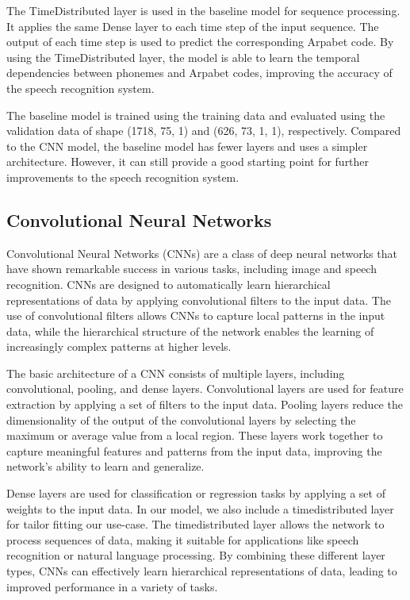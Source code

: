 \documentclass[12pt]{article}
\begin{document}
The TimeDistributed layer is used in the baseline model for sequence processing. It applies the same Dense layer to each time step of the input sequence. The output of each time step is used to predict the corresponding Arpabet code. By using the TimeDistributed layer, the model is able to learn the temporal dependencies between phonemes and Arpabet codes, improving the accuracy of the speech recognition system.

The baseline model is trained using the training data and evaluated using the validation data of shape (1718, 75, 1) and (626, 73, 1, 1), respectively. Compared to the CNN model, the baseline model has fewer layers and uses a simpler architecture. However, it can still provide a good starting point for further improvements to the speech recognition system.

\subsection{Convolutional Neural Networks}

Convolutional Neural Networks (CNNs) are a class of deep neural networks that have shown remarkable success in various tasks, including image and speech recognition. CNNs are designed to automatically learn hierarchical representations of data by applying convolutional filters to the input data. The use of convolutional filters allows CNNs to capture local patterns in the input data, while the hierarchical structure of the network enables the learning of increasingly complex patterns at higher levels.

The basic architecture of a CNN consists of multiple layers, including convolutional, pooling, and dense layers. Convolutional layers are used for feature extraction by applying a set of filters to the input data. Pooling layers reduce the dimensionality of the output of the convolutional layers by selecting the maximum or average value from a local region. These layers work together to capture meaningful features and patterns from the input data, improving the network's ability to learn and generalize.

Dense layers are used for classification or regression tasks by applying a set of weights to the input data. In our model, we also include a timedistributed layer for tailor fitting our use-case. The timedistributed layer allows the network to process sequences of data, making it suitable for applications like speech recognition or natural language processing. By combining these different layer types, CNNs can effectively learn hierarchical representations of data, leading to improved performance in a variety of tasks.
\end{document}
